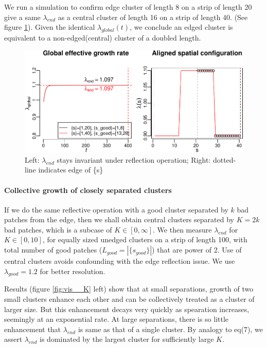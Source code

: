 \documentclass[a4paperpaper,]{article}
\let\oldparagraph\paragraph
\renewcommand{\paragraph}[1]{\oldparagraph{#1}\mbox{}}
\begin{document}
We run a simulation to confirm edge cluster of length 8 on a strip of
length 20 give a same \(\lambda_{end}\) as a central cluster of length
16 on a strip of length 40. (See figure \ref{fig:reflect_sep}). Given
the identical \(\lambda_{global}(t)\), we conclude an edged cluster is
equivalent to a non-edged(central) cluster of a doubled length.

\begin{figure}
\centering
\includegraphics{index_files/figure-latex/reflect_sep-1.pdf}
\caption{\label{fig:reflect_sep} Left: \(\lambda_{end}\) stays invariant
under reflection operation; \newline Right: dotted-line indicates edge
of \{s\}}
\end{figure}

\paragraph{\texorpdfstring{Collective growth of closely separated
clusters
\label{sec:collect}}{Collective growth of closely separated clusters }}\label{collective-growth-of-closely-separated-clusters}

If we do the same reflective operation with a good cluster separated by
\(k\) bad patches from the edge, then we shall obtain central clusters
separated by \(K=2k\) bad patches, which is a subcase of
\(K\in [0,\infty]\). We then measure \(\lambda_{end}\) for
\(K\in[0,10]\), for equally sized unedged clusters on a strip of length
100, with total number of good patches (\(L_{good}=|\{s_{good}\}|\))
that are power of 2. Use of central clusters avoids confounding with the
edge reflection issue. We use \(\lambda_{good}=1.2\) for better
resolution.

Results (figure \ref{fig:vis__K} left) show that at small separations,
growth of two small clusters enhance each other and can be collectively
treated as a cluster of larger size. But this enhancement decays very
quickly as spearation increases, seemingly at an exponential rate. At
large separations, there is so little enhancement that \(\lambda_{end}\)
is same as that of a single cluster. By analogy to eq(7), we assert
\(\lambda_{end}\) is dominated by the largest cluster for sufficiently
large \(K\).
\end{document}
